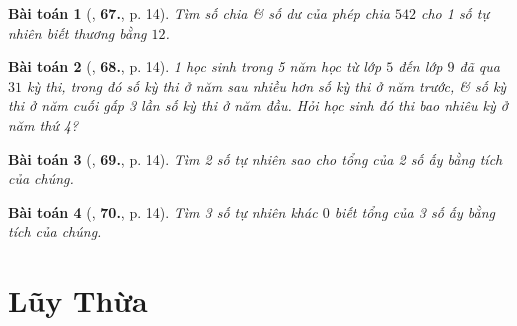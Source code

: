 \documentclass{article}
\numberwithin{equation}{section}
\newtheorem{baitoan}{Bài toán}
\begin{document}
\begin{baitoan}[\cite{Binh_Toan_6_tap_1}, \textbf{67.}, p. 14]
	Tìm số chia \& số dư của phép chia $542$ cho 1 số tự nhiên biết thương bằng $12$.
\end{baitoan}

\begin{baitoan}[\cite{Binh_Toan_6_tap_1}, \textbf{68.}, p. 14]
	1 học sinh trong 5 năm học từ lớp $5$ đến lớp $9$ đã qua $31$ kỳ thi, trong đó số kỳ thi ở năm sau nhiều hơn số kỳ thi ở năm trước, \& số kỳ thi ở năm cuối gấp 3 lần số kỳ thi ở năm đầu. Hỏi học sinh đó thi bao nhiêu kỳ ở năm thứ 4?
\end{baitoan}

\begin{baitoan}[\cite{Binh_Toan_6_tap_1}, \textbf{69.}, p. 14]
	Tìm 2 số tự nhiên sao cho tổng của 2 số ấy bằng tích của chúng.
\end{baitoan}

\begin{baitoan}[\cite{Binh_Toan_6_tap_1}, \textbf{70.}, p. 14]
	Tìm 3 số tự nhiên khác $0$ biết tổng của 3 số ấy bằng tích của chúng.
\end{baitoan}


\section{Lũy Thừa}


\printbibliography[heading=bibintoc]
	
\end{document}

